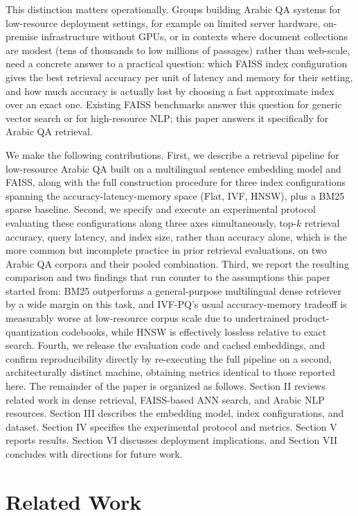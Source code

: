 \documentclass[conference]{IEEEtran}
\begin{document}
This distinction matters operationally. Groups building Arabic QA systems for low-resource deployment settings, for example on limited server hardware, on-premise infrastructure without GPUs, or in contexts where document collections are modest (tens of thousands to low millions of passages) rather than web-scale, need a concrete answer to a practical question: which FAISS index configuration gives the best retrieval accuracy per unit of latency and memory for their setting, and how much accuracy is actually lost by choosing a fast approximate index over an exact one. Existing FAISS benchmarks answer this question for generic vector search or for high-resource NLP; this paper answers it specifically for Arabic QA retrieval.

We make the following contributions. First, we describe a retrieval pipeline for low-resource Arabic QA built on a multilingual sentence embedding model and FAISS, along with the full construction procedure for three index configurations spanning the accuracy-latency-memory space (Flat, IVF, HNSW), plus a BM25 sparse baseline. Second, we specify and execute an experimental protocol evaluating these configurations along three axes simultaneously, top-$k$ retrieval accuracy, query latency, and index size, rather than accuracy alone, which is the more common but incomplete practice in prior retrieval evaluations, on two Arabic QA corpora and their pooled combination. Third, we report the resulting comparison and two findings that run counter to the assumptions this paper started from: BM25 outperforms a general-purpose multilingual dense retriever by a wide margin on this task, and IVF-PQ's usual accuracy-memory tradeoff is measurably worse at low-resource corpus scale due to undertrained product-quantization codebooks, while HNSW is effectively lossless relative to exact search. Fourth, we release the evaluation code and cached embeddings, and confirm reproducibility directly by re-executing the full pipeline on a second, architecturally distinct machine, obtaining metrics identical to those reported here. The remainder of the paper is organized as follows. Section II reviews related work in dense retrieval, FAISS-based ANN search, and Arabic NLP resources. Section III describes the embedding model, index configurations, and dataset. Section IV specifies the experimental protocol and metrics. Section V reports results. Section VI discusses deployment implications, and Section VII concludes with directions for future work.

\section{Related Work}
\end{document}
